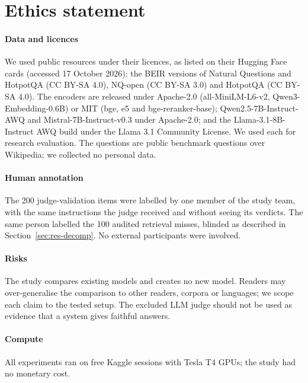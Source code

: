 \section*{Ethics statement}
\paragraph{Data and licences} We used public resources under their licences, as listed on their Hugging Face cards (accessed 17 October 2026): the BEIR versions of Natural Questions and HotpotQA (CC BY-SA 4.0), NQ-open (CC BY-SA 3.0) and HotpotQA (CC BY-SA 4.0). The encoders are released under Apache-2.0 (all-MiniLM-L6-v2, Qwen3-Embedding-0.6B) or MIT (bge, e5 and bge-reranker-base); Qwen2.5-7B-Instruct-AWQ and Mistral-7B-Instruct-v0.3 under Apache-2.0; and the Llama-3.1-8B-Instruct AWQ build under the Llama 3.1 Community License. We used each for research evaluation. The questions are public benchmark questions over Wikipedia; we collected no personal data.

\paragraph{Human annotation} The 200 judge-validation items were labelled by one member of the study team, with the same instructions the judge received and without seeing its verdicts. The same person labelled the 100 audited retrieval misses, blinded as described in Section~\ref{sec:res-decomp}. No external participants were involved.

\paragraph{Risks} The study compares existing models and creates no new model. Readers may over-generalise the comparison to other readers, corpora or languages; we scope each claim to the tested setup. The excluded LLM judge should not be used as evidence that a system gives faithful answers.

\paragraph{Compute} All experiments ran on free Kaggle sessions with Tesla T4 GPUs; the study had no monetary cost.
